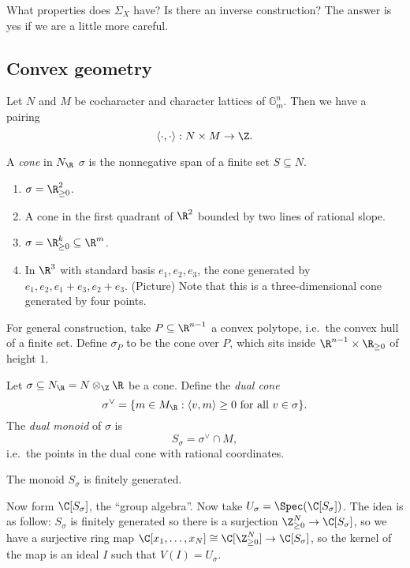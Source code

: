 \documentclass[a4paper]{article}
\begin{document}
What properties does \(\Sigma_X\) have? Is there an inverse construction? The answer is yes if we are a little more careful.

\subsection{Convex geometry}

Let \(N\) and \(M\) be cocharacter and character lattices of \(\mathbb G_m^n\). Then we have a pairing
\[
  \langle \cdot, \cdot \rangle: N \times M \to \Z.
\]

\begin{definition}[cone]
  A \emph{cone} in \(N_\R\) \(\sigma\) is the nonnegative span of a finite set \(S \subseteq N\).
\end{definition}

\begin{eg}\leavevmode
  \begin{enumerate}
  \item \(\sigma = \R^2_{\geq 0}\).
  \item A cone in the first quadrant of \(\R^2\) bounded by two lines of rational slope.
  \item \(\sigma = \R^k_{\geq 0} \subseteq \R^m\).
  \item In \(\R^3\) with standard basis \(e_1, e_2, e_3\), the cone generated by \(e_1, e_2, e_1 + e_3, e_2 + e_3\). (Picture) Note that this is a three-dimensional cone generated by four points.
  \end{enumerate}
\end{eg}

For general construction, take \(P \subseteq \R^{n - 1}\) a convex polytope, i.e.\ the convex hull of a finite set. Define \(\sigma_P\) to be the cone over \(P\), which sits inside \(\R^{n - 1} \times \R_{\geq 0}\) of height \(1\).

Let \(\sigma \subseteq N_\R = N \otimes_\Z \R\) be a cone. Define the \emph{dual cone}
\[
  \sigma^\vee = \{m \in M_\R: \langle v, m \rangle \geq 0 \text{ for all } v \in \sigma\}.
\]
The \emph{dual monoid} of \(\sigma\) is
\[
  S_\sigma = \sigma^\vee \cap M,
\]
i.e.\ the points in the dual cone with rational coordinates.

\begin{ex}
  The monoid \(S_\sigma\) is finitely generated.
\end{ex}

Now form \(\C[S_\sigma]\), the ``group algebra''. Now take \(U_\sigma = \Spec(\C[S_\sigma])\). The idea is as follow: \(S_\sigma\) is finitely generated so there is a surjection \(\Z^N_{\geq 0} \to \C[S_\sigma]\), so we have a surjective ring map \(\C[x_1, \dots, x_N] \cong \C[\Z^N_{\geq 0}] \to \C[S_\sigma]\), so the kernel of the map is an ideal \(I\) such that \(V(I) = U_\sigma\).
\end{document}
